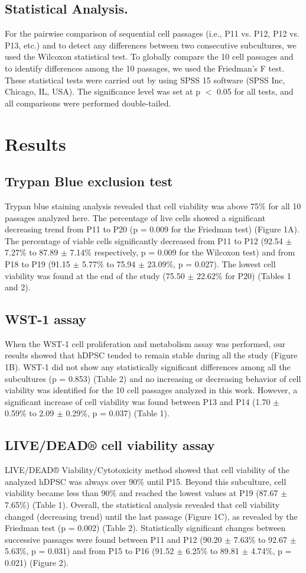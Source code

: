 \documentclass[a4paper,twocolumn,12pt]{article}
\begin{document}
\subsection{Statistical Analysis.}
For the pairwise comparison of sequential cell passages (i.e., P11 vs. P12, P12 vs. P13, etc.) and to detect any differences between two consecutive subcultures, we used the Wilcoxon statistical test. To globally compare the 10 cell passages and to identify differences among the 10 passages, we used the Friedman’s F test. These statistical tests were carried out by using SPSS 15 software (SPSS Inc, Chicago, IL, USA). The significance level was set at p $<$ 0.05 for all tests, and all comparisons were performed double-tailed.
\section{Results}
\subsection{Trypan Blue exclusion test}
Trypan blue staining analysis revealed that cell viability was above 75\% for all 10 passages analyzed here. The percentage of live cells showed a significant decreasing trend from P11 to P20 (p = 0.009 for the Friedman test) (Figure 1A). The percentage of viable cells significantly decreased from P11 to P12 (92.54 $\pm$ 7.27\% to 87.89 $\pm$ 7.14\% respectively, p = 0.009 for the Wilcoxon test) and from P18 to P19 (91.15 $\pm$ 5.77\% to 75.94 $\pm$ 23.09\%, p = 0.027). The lowest cell viability was found at the end of the study (75.50 $\pm$ 22.62\% for P20) (Tables 1 and 2).

\subsection{WST-1 assay}
When the WST-1 cell proliferation and metabolism assay was performed, our results showed that hDPSC tended to remain stable during all the study (Figure 1B). WST-1 did not show any statistically significant differences among all the subcultures (p = 0.853) (Table 2) and no increasing or decreasing behavior of cell viability was identified for the 10 cell passages analyzed in this work. However, a significant increase of cell viability was found between P13 and P14 (1.70 $\pm$ 0.59\% to 2.09 $\pm$ 0.29\%, p = 0.037) (Table 1). 
\subsection{LIVE/DEAD® cell viability assay}
LIVE/DEAD® Viability/Cytotoxicity method showed that cell viability of the analyzed hDPSC was always over 90\% until P15. Beyond this subculture, cell viability became less than 90\% and reached the lowest values at P19 (87.67 $\pm$ 7.65\%) (Table 1). Overall, the statistical analysis revealed that cell viability changed (decreasing trend) until the last passage (Figure 1C), as revealed by the Friedman test (p = 0.002) (Table 2). Statistically significant changes between successive passages were found between P11 and P12 (90.20 $\pm$ 7.63\% to 92.67 $\pm$ 5.63\%, p = 0.031) and from P15 to P16 (91.52 $\pm$ 6.25\% to 89.81 $\pm$ 4.74\%, p = 0.021) (Figure 2).
\end{document}
